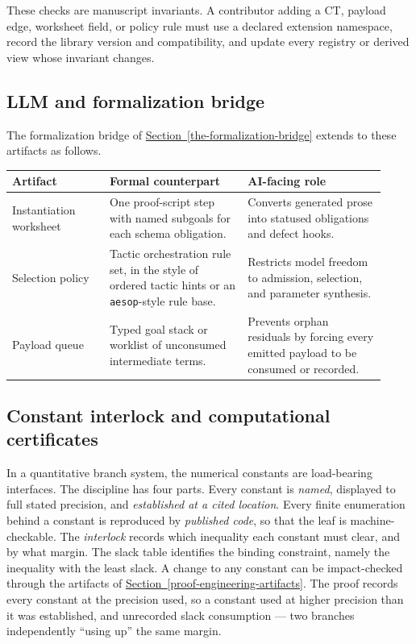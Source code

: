 \documentclass[
  11pt,
]{article}
\theoremstyle{definition}
\newcommand{\secref}[1]{\hyperref[#1]{Section~\ref*{#1}}}
\begin{document}
These checks are manuscript invariants. A contributor adding a CT,
payload edge, worksheet field, or policy rule must use a declared
extension namespace, record the library version and compatibility, and
update every registry or derived view whose invariant changes.

\subsection{LLM and formalization bridge}\label{llm-and-formalization-bridge}

The formalization bridge of \secref{the-formalization-bridge}
extends to these artifacts as follows.

\begingroup
\small
\setlength{\tabcolsep}{2pt}
\begin{longtable}[]{@{}
  >{\raggedright\arraybackslash}p{0.24\linewidth}
  >{\raggedright\arraybackslash}p{0.34\linewidth}
  >{\raggedright\arraybackslash}p{0.34\linewidth}@{}}
\toprule\noalign{}
Artifact & Formal counterpart & AI-facing role \\
\midrule\noalign{}
\endhead
\bottomrule\noalign{}
\endlastfoot
Instantiation worksheet & One proof-script step with named subgoals for each schema obligation. & Converts generated prose into statused obligations and defect hooks. \\
Selection policy & Tactic orchestration rule set, in the style of ordered tactic hints or an \texttt{aesop}-style rule base. & Restricts model freedom to admission, selection, and parameter synthesis. \\
Payload queue & Typed goal stack or worklist of unconsumed intermediate terms. & Prevents orphan residuals by forcing every emitted payload to be consumed or recorded. \\
\end{longtable}
\endgroup

\subsection{Constant interlock and computational
certificates}\label{constant-interlock-and-computational-certificates}

In a quantitative branch system, the numerical constants are
load-bearing interfaces. The discipline has four parts. Every constant
is \emph{named}, displayed to full stated precision, and
\emph{established at a cited location}. Every finite enumeration behind
a constant is reproduced by \emph{published code}, so that the leaf is
machine-checkable. The \emph{interlock} records which inequality each
constant must clear, and by what margin. The slack table identifies the
binding constraint, namely the inequality with the least slack. A change
to any constant can be impact-checked through the artifacts of \secref{proof-engineering-artifacts}. The proof records every constant at the precision used, so a constant used at higher precision than it was
established, and unrecorded slack consumption --- two branches
independently ``using up'' the same margin.
\end{document}
